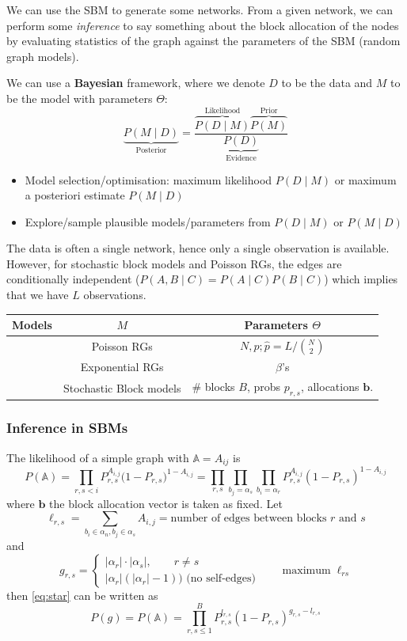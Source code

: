 \documentclass[12pt]{article}
\theoremstyle{definition}
\newcommand{\A}{\mathbb{A}}
\newcommand{\given}{\;|\;}
\newcommand{\br}[1]{\left({#1}\right)}
\newcommand{\abs}[1]{\left|{#1}\right|}
\begin{document}
We can use the SBM to generate some networks. From a given network, we can perform some \textit{inference} to say something about the block allocation of the nodes by evaluating statistics of the graph against the parameters of the SBM (random graph models). 

We can use a \textbf{Bayesian} framework, where we denote $D$ to be the data and $M$ to be the model with parameters $\Theta$: 
\[ \underbrace{P(M\mid D)}_{\mathrm{Posterior}} = {\frac{\overbrace{P(D\mid M)}^{\mathrm{Likelihood}}\overbrace{P(M)}^{\mathrm{Prior}}}{\underbrace{P(D)}_{\mathrm{Evidence}}}}\]
\begin{itemize}
    \item Model selection/optimisation: maximum likelihood $P\br{D\given M}$ or maximum a posteriori estimate $P(M\given D)$
    \item  Explore/sample plausible models/parameters from $P\br{D\given M}$ or $P\br{M\given D}$
\end{itemize}

The data is often a single network, hence only a single observation is available. However, for stochastic block models and Poisson RGs, the edges are conditionally independent ($P\br{A,B\given C} = P\br{A\given C}P\br{B\given C}$) which implies that we have $L$ observations. 

\begin{center}
\begin{tabular}{ c c c }
Models & $M$ & Parameters $\Theta$ \\ 
 \hline
 & Poisson RGs & $N,p;\hat{p}=L/\binom N2$ \\  
& Exponential RGs& $\beta$'s \\
& Stochastic Block models & 
     \# blocks $B$, probs $p_{r,s}$, allocations $\boldsymbol b$.
\end{tabular}
\end{center}

\subsubsection{Inference in SBMs}

The likelihood of a simple graph with 
$\A = A_{ij}$ is 
\begin{equation}
\label{eq:star}
    P(\A) = \prod_{{r,s<i}} P_{r,s}^{A_{i,j}} \bigl(1-P_{r,s}\bigr)^{1-A_{i,j}} = \prod_{r,s}\prod_{b_j=\alpha_s}\prod_{b_i=\alpha_r} P_{r,s}^{A_{i,j}}(1-P_{r,s})^{1-A_{i,j}}
\end{equation}
where $\boldsymbol b$ the block allocation vector is taken as fixed. Let
\[ 
\ell_{r,s} = \sum_{b_i \in \alpha_n, b_j\in \alpha_s} A_{i,j} = \text{number of edges between blocks $r$ and $s$}
\]
and 
\[
g_{r,s} = 
\begin{cases}
    |\alpha_r|\cdot |\alpha_s|, \qquad r\neq s \\
    \abs{\alpha_r} \br{\abs{\alpha_r}-1}) \text{ (no self-edges)}
\end{cases}\qquad\mathrm{maximum}\; \ell_{rs}
\]
then \eqref{eq:star} can be written as
\begin{equation}
\label{eq:MLE}
   P(g) =P(\mathbb A) = \prod_{r,s \leq 1}^B P_{r,s}^{l_{r,s}} (1-P_{r,s})^{g_{r,s} - l_{r,s}}
\end{equation}
\end{document}

